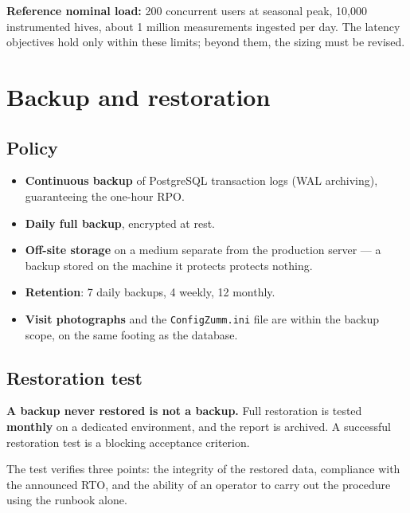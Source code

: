 \begin{encadre}
\textbf{Reference nominal load:} 200 concurrent users at seasonal peak, 10,000
instrumented hives, about 1 million measurements ingested per day. The latency
objectives hold only within these limits; beyond them, the sizing must be
revised.
\end{encadre}

\section{Backup and restoration}
\subsection{Policy}
\begin{itemize}
  \item \textbf{Continuous backup} of PostgreSQL transaction logs (WAL
        archiving), guaranteeing the one-hour RPO.
  \item \textbf{Daily full backup}, encrypted at rest.
  \item \textbf{Off-site storage} on a medium separate from the production
        server --- a backup stored on the machine it protects protects nothing.
  \item \textbf{Retention}: 7 daily backups, 4 weekly, 12 monthly.
  \item \textbf{Visit photographs} and the \texttt{ConfigZumm.ini} file are
        within the backup scope, on the same footing as the database.
\end{itemize}

\subsection{Restoration test}
\begin{encadre}
\textbf{A backup never restored is not a backup.} Full restoration is tested
\textbf{monthly} on a dedicated environment, and the report is archived. A
successful restoration test is a blocking acceptance criterion.
\end{encadre}

The test verifies three points: the integrity of the restored data, compliance
with the announced RTO, and the ability of an operator to carry out the
procedure using the runbook alone.

